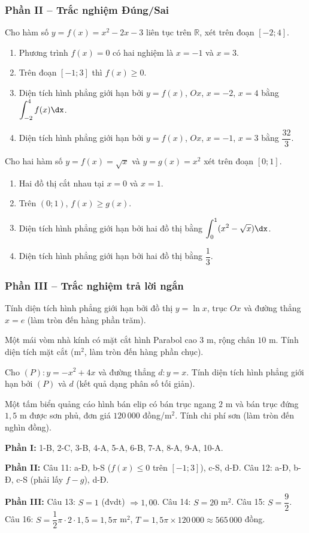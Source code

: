 \subsubsection*{Phần II -- Trắc nghiệm Đúng/Sai}

\cauhoi Cho hàm số $y=f(x)=x^2-2x-3$ liên tục trên $\mathbb{R}$, xét trên đoạn $[-2;4]$.
\begin{enumerate}[label=\textbf{\alph*)}, leftmargin=1cm]
  \item Phương trình $f(x)=0$ có hai nghiệm là $x=-1$ và $x=3$.
  \item Trên đoạn $[-1;3]$ thì $f(x)\ge 0$.
  \item Diện tích hình phẳng giới hạn bởi $y=f(x)$, $Ox$, $x=-2$, $x=4$ bằng $\displaystyle\int_{-2}^4 f(x)\dx$.
  \item Diện tích hình phẳng giới hạn bởi $y=f(x)$, $Ox$, $x=-1$, $x=3$ bằng $\dfrac{32}{3}$.
\end{enumerate}

\cauhoi Cho hai hàm số $y=f(x)=\sqrt{x}$ và $y=g(x)=x^2$ xét trên đoạn $[0;1]$.
\begin{enumerate}[label=\textbf{\alph*)}, leftmargin=1cm]
  \item Hai đồ thị cắt nhau tại $x=0$ và $x=1$.
  \item Trên $(0;1)$, $f(x)\ge g(x)$.
  \item Diện tích hình phẳng giới hạn bởi hai đồ thị bằng $\displaystyle\int_0^1(x^2-\sqrt x)\dx$.
  \item Diện tích hình phẳng giới hạn bởi hai đồ thị bằng $\dfrac13$.
\end{enumerate}

\subsubsection*{Phần III -- Trắc nghiệm trả lời ngắn}

\cauhoi Tính diện tích hình phẳng giới hạn bởi đồ thị $y=\ln x$, trục $Ox$ và đường thẳng $x=e$ (làm tròn đến hàng phần trăm).

\cauhoi Một mái vòm nhà kính có mặt cắt hình Parabol cao $3$ m, rộng chân $10$ m. Tính diện tích mặt cắt (m$^2$, làm tròn đến hàng phần chục).

\cauhoi Cho $(P):y=-x^2+4x$ và đường thẳng $d:y=x$. Tính diện tích hình phẳng giới hạn bởi $(P)$ và $d$ (kết quả dạng phân số tối giản).

\cauhoi Một tấm biển quảng cáo hình bán elip có bán trục ngang $2$ m và bán trục đứng $1{,}5$ m được sơn phủ, đơn giá $120\,000$ đồng/m$^2$. Tính chi phí sơn (làm tròn đến nghìn đồng).

\clearpage
\begin{hopchuy}[Đáp án]
\textbf{Phần I:} 1-B, 2-C, 3-B, 4-A, 5-A, 6-B, 7-A, 8-A, 9-A, 10-A.

\textbf{Phần II:} Câu 11: a-Đ, b-S ($f(x)\le0$ trên $[-1;3]$), c-S, d-Đ. \quad Câu 12: a-Đ, b-Đ, c-S (phải lấy $f-g$), d-Đ.

\textbf{Phần III:} Câu 13: $S=1$ (đvdt) $\Rightarrow 1{,}00$. \quad Câu 14: $S=20$ m$^2$. \quad Câu 15: $S=\dfrac{9}{2}$. \quad Câu 16: $S=\dfrac12\pi\cdot2\cdot1{,}5=1{,}5\pi$ m$^2$, $T=1{,}5\pi\times120\,000\approx 565\,000$ đồng.
\end{hopchuy}

\newpage
